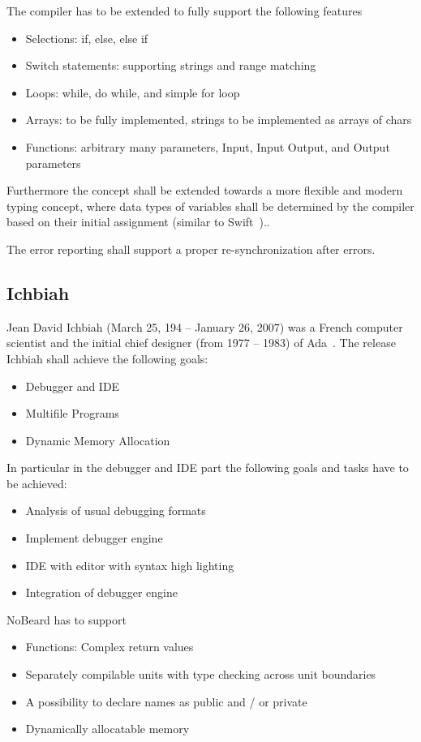\documentclass[11pt]{article}
\begin{document}
The compiler has to be extended to fully support the following features
\begin{itemize}
	\item Selections: if, else, else if
	\item Switch statements: supporting strings and range matching
	\item Loops: while, do while, and simple for loop
	\item Arrays: to be fully implemented, strings to be implemented as arrays of chars
	\item Functions: arbitrary many parameters, Input, Input Output, and Output parameters
\end{itemize}	
Furthermore the concept shall be extended towards a more flexible and modern typing concept, where data types of variables shall be determined by the compiler based on their initial assignment (similar to Swift~\cite{apple_swift_2014})..  

The error reporting shall support a proper re-synchronization after errors.

\subsection{Ichbiah}
Jean David Ichbiah (March 25, 194 -- January 26, 2007) was a French computer scientist and the initial chief designer (from 1977 -- 1983) of Ada~\cite{wikipedia_jean_2014}. The release Ichbiah shall achieve the following goals:
\begin{itemize}
	\item Debugger and IDE
	\item Multifile Programs
	\item Dynamic Memory Allocation
\end{itemize}

In particular in the debugger and IDE part the following goals and tasks have to be achieved: 
\begin{itemize}
	\item Analysis of usual debugging formats
	\item Implement debugger engine
	\item IDE with editor with syntax high lighting
	\item Integration of debugger engine
\end{itemize}

NoBeard has to support
\begin{itemize}
	\item Functions: Complex return values
	\item Separately compilable units with type checking across unit boundaries
	\item A possibility to declare names as public and / or private
	\item Dynamically allocatable memory
\end{itemize}
\end{document}
